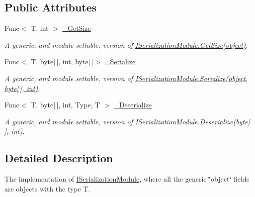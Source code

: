 \subsection*{Public Attributes}
\begin{DoxyCompactItemize}
\item 
Func$<$ T, int $>$ \hyperlink{class_skyrates_1_1_util_1_1_serializing_1_1_bit_serialize_attribute_1_1_serialization_module_3_01_t_01_4_adbe29acc599d47788a9215ab01364007}{\-\_\-\-Get\-Size}
\begin{DoxyCompactList}\small\item\em A generic, and module settable, version of \hyperlink{interface_skyrates_1_1_util_1_1_serializing_1_1_bit_serialize_attribute_1_1_i_serialization_module_aa1b15bcdfbdbf7422513276ffcf3d272}{I\-Serialization\-Module.\-Get\-Size(object)}. \end{DoxyCompactList}\item 
Func$<$ T, byte\mbox{[}$\,$\mbox{]}, int, byte\mbox{[}$\,$\mbox{]}$>$ \hyperlink{class_skyrates_1_1_util_1_1_serializing_1_1_bit_serialize_attribute_1_1_serialization_module_3_01_t_01_4_acc07c7d7f8bb9725a4069d3297a25b43}{\-\_\-\-Serialize}
\begin{DoxyCompactList}\small\item\em A generic, and module settable, version of \hyperlink{interface_skyrates_1_1_util_1_1_serializing_1_1_bit_serialize_attribute_1_1_i_serialization_module_a193efb5678e7782fb5de5c2f7c9116da}{I\-Serialization\-Module.\-Serialize(object, byte\mbox{[}$\,$\mbox{]}, int)}. \end{DoxyCompactList}\item 
Func$<$ T, byte\mbox{[}$\,$\mbox{]}, int, Type, T $>$ \hyperlink{class_skyrates_1_1_util_1_1_serializing_1_1_bit_serialize_attribute_1_1_serialization_module_3_01_t_01_4_a18c91051263bb48bb0de1f2125f2f927}{\-\_\-\-Deserialize}
\begin{DoxyCompactList}\small\item\em A generic, and module settable, version of I\-Serialization\-Module.\-Deserialize(byte\mbox{[}$\,$\mbox{]}, int). \end{DoxyCompactList}\end{DoxyCompactItemize}


\subsection{Detailed Description}
The implementation of \hyperlink{interface_skyrates_1_1_util_1_1_serializing_1_1_bit_serialize_attribute_1_1_i_serialization_module}{I\-Serialization\-Module}, where all the generic \char`\"{}object\char`\"{} fields are objects with the type T. 


